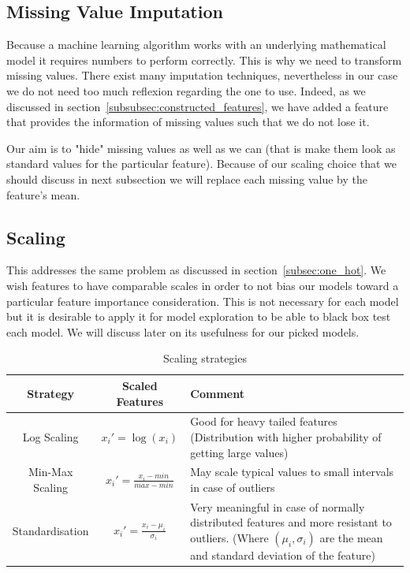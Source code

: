 \subsection{Missing Value Imputation}
Because a machine learning algorithm works with an underlying mathematical model it requires numbers to perform correctly. This is why we need to transform missing values. There exist many imputation techniques, nevertheless in our case we do not need too much reflexion regarding the one to use. Indeed, as we discussed in section~\ref{subsubsec:constructed_features}, we have added a feature that provides the information of missing values such that we do not lose it. 

Our aim is to "hide" missing values as well as we can (that is make them look as standard values for the particular feature). Because of our scaling choice that we should discuss in next subsection we will replace each missing value by the feature's mean.


\subsection{Scaling}
This addresses the same problem as discussed in section~\ref{subsec:one_hot}. We wish features to have comparable scales in order to not bias our models toward a particular feature importance consideration. This is not necessary for each model but it is desirable to apply it for model exploration to be able to black box test each model. We will discuss later on its usefulness for our picked models. 

\begin{table}[h]
\begin{center}
\begin{tabular}{c c p{80mm}}
\hline
\textbf{Strategy} & \textbf{Scaled Features} & \textbf{Comment} \\ 
\hline\hline
Log Scaling & $x_i'=\log(x_i)$ & Good for heavy tailed features (Distribution with higher probability of getting large values)\\
Min-Max Scaling & $x_i' = \frac{x_i - min}{max-min}$  & May scale typical values to small intervals in case of outliers\\
Standardisation & $x_i' = \frac{x_i - \mu_i}{\sigma_i}$ & Very meaningful in case of normally distributed features and more resistant to outliers. (Where $(\mu_i, \sigma_i)$ are the mean and standard deviation of the feature)
\end{tabular}
\end{center}
\caption{\label{scaling}Scaling strategies}
\end{table}

